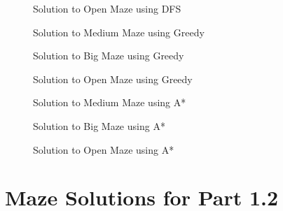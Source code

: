 \documentclass{article}[12pt]
\begin{document}
\begin{appendices}
   \begin{figure}[!htb]
   \centering
   \caption{Solution to Open Maze using DFS}
   \label{fig:dfs_openmaze}
   \end{figure}
   
   \begin{figure}[!htb]
   \centering
   \caption{Solution to Medium Maze using Greedy}
   \label{fig:greedy_medmaze}
   \end{figure}
   
   \begin{figure}[!htb]
   \centering
   \caption{Solution to Big Maze using Greedy}
   \label{fig:greedy_bigmaze}
   \end{figure}
   
   \begin{figure}[!htb]
   \centering
   \caption{Solution to Open Maze using Greedy}
   \label{fig:greedy_openmaze}
   \end{figure}
   
   
   \begin{figure}[!htb]
   \centering
   \caption{Solution to Medium Maze using A*}
   \label{fig:astar_medmaze}
   \end{figure}
   
   \begin{figure}[!htb]
   \centering
   \caption{Solution to Big Maze using A*}
   \label{fig:astar_bigmaze}
   \end{figure}
   
   \begin{figure}[!htb]
   \centering
   \caption{Solution to Open Maze using A*}
   \label{fig:astar_openmaze}
   \end{figure}
   
   \section{Maze Solutions for Part 1.2}
   \label{appendix:p12}
   

\end{appendices}
\end{document}
